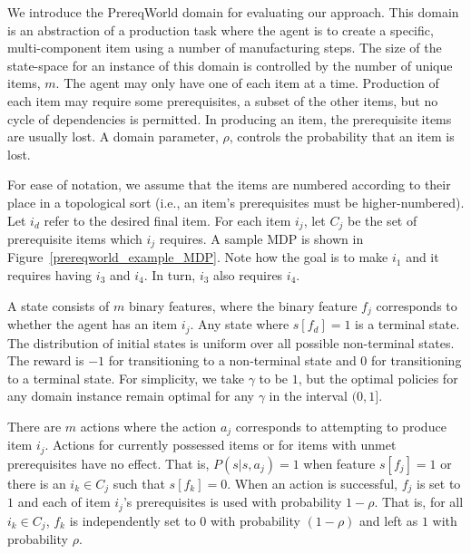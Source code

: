 \documentclass[letterpaper]{article} %
\begin{document}
We introduce the PrereqWorld domain for evaluating our approach.
This domain is an abstraction of a production task where the agent is to create a specific, multi-component item using a number of manufacturing steps.
The size of the state-space for an instance of this domain is controlled by the number of unique items, $m$.
The agent may only have one of each item at a time.
Production of each item may require some prerequisites, a subset of the other items, but no cycle of dependencies is permitted.
In producing an item, the prerequisite items are usually lost.
A domain parameter, $\rho$, controls the probability that an item is lost.

For ease of notation, we assume that the items are numbered according to their place in a topological sort (i.e., an item's prerequisites must be higher-numbered).
Let $i_d$ refer to the desired final item.
For each item $i_j$, let $C_j$ be the set of prerequisite items which $i_j$ requires.
A sample MDP is shown in Figure~\ref{prereqworld_example_MDP}.
Note how the goal is to make $i_1$ and it requires having $i_3$ and $i_4$. In turn, $i_3$ also requires $i_4$.

A state consists of $m$ binary features, where the binary feature $f_j$ corresponds to whether the agent has an item $i_j$.
Any state where $s[f_d]=1$ is a terminal state.
The distribution of initial states is uniform over all possible non-terminal states.
The reward is $-1$ for transitioning to a non-terminal state and $0$ for transitioning to a terminal state.
For simplicity, we take $\gamma$ to be $1$, but the optimal policies for any domain instance remain optimal for any $\gamma$ in the interval $(0,1]$.

There are $m$ actions where the action $a_j$ corresponds to attempting to produce item $i_j$.
Actions for currently possessed items or for items with unmet prerequisites have no effect.
That is, $P(s | s, a_j) = 1$ when feature $s[f_j] = 1$ or there is an $i_k \in C_j$ such that $s[f_k] = 0$.
When an action is successful, $f_j$ is set to $1$ and each of item $i_j$'s prerequisites is used with probability $1-\rho$. That is, for all $i_k \in C_j$, $f_k$ is independently set to $0$ with probability $(1-\rho)$ and left as $1$ with probability $\rho$.

\end{document}

